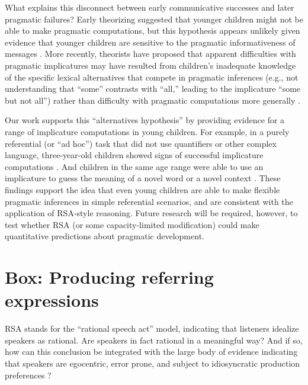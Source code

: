 \documentclass[]{elsarticle}
\begin{document}
What explains this disconnect between early communicative successes and
later pragmatic failures? Early theorizing suggested that younger
children might not be able to make pragmatic computations, but this hypothesis appears unlikely given evidence that
younger children are sensitive to the pragmatic informativeness of
messages \citep{katsos2011,oneill2001}. More
recently, theorists have proposed that apparent difficulties with
pragmatic implicatures may have resulted from children's inadequate
knowledge of the specific lexical alternatives that compete in pragmatic
inferences (e.g., not understanding that ``some'' contrasts with
``all,'' leading to the implicature ``some but not all'') rather than
difficulty with pragmatic computations more generally \citep{barner2011}.

Our work supports this ``alternatives hypothesis'' by providing evidence
for a range of implicature computations in young children. For example,
in a purely referential (or ``ad hoc'') task that did not use
quantifiers or other complex language, three-year-old children showed
signs of successful implicature computations \citep{stiller2015}. And children in the same age range were able to use an
implicature to guess the meaning of a novel word \citep{frank2014} or a novel context \citep{horowitz2016}. These findings support the idea that even young children are able
to make flexible pragmatic inferences in simple referential scenarios,
and are consistent with the application of RSA-style reasoning. Future
research will be required, however, to test whether RSA (or some
capacity-limited modification) could make quantitative predictions about
pragmatic development.

\section{Box: Producing referring expressions}\label{box-producing-referring-expressions}
\label{proref}

RSA stands for the ``rational speech act'' model, indicating that listeners idealize speakers as rational.
Are speakers in fact rational in a meaningful way? And if so, how can this conclusion be
integrated with the large body of evidence indicating that speakers are
egocentric, error prone, and subject to idiosyncratic production
preferences \citep{keysar2003,lane2006,gatt2013}?
\end{document}

